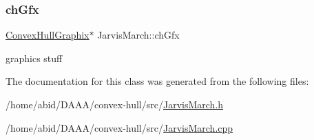 \subsubsection{\texorpdfstring{chGfx}{chGfx}}
{\footnotesize\ttfamily \mbox{\hyperlink{class_convex_hull_graphix}{Convex\+Hull\+Graphix}}$\ast$ Jarvis\+March\+::ch\+Gfx}

graphics stuff 

The documentation for this class was generated from the following files\+:\begin{DoxyCompactItemize}
\item 
/home/abid/\+D\+A\+A\+A/convex-\/hull/src/\mbox{\hyperlink{_jarvis_march_8h}{Jarvis\+March.\+h}}\item 
/home/abid/\+D\+A\+A\+A/convex-\/hull/src/\mbox{\hyperlink{_jarvis_march_8cpp}{Jarvis\+March.\+cpp}}\end{DoxyCompactItemize}
